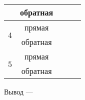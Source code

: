 \begin{table}[h]
\begin{tabular}{|c|c|c|c|c|}
                                                                      & обратная   &                                                                     &                                                                      &                                                                       \\ \hline
\multirow{2}{*}{4}                                                    & прямая     &                                                                     &                                                                      &                                                                       \\ \cline{2-5} 
                                                                      & обратная   &                                                                     &                                                                      &                                                                       \\ \hline
\multirow{2}{*}{5}                                                    & прямая     & \multicolumn{1}{l|}{}                                               & \multicolumn{1}{l|}{}                                                & \multicolumn{1}{l|}{}                                                 \\ \cline{2-5} 
                                                                      & обратная   & \multicolumn{1}{l|}{}                                               & \multicolumn{1}{l|}{}                                                & \multicolumn{1}{l|}{}                                                 \\ \hline
\end{tabular}
\end{table}

Вывод --- \hrulefill

\hrulefill

\hrulefill


\newpage